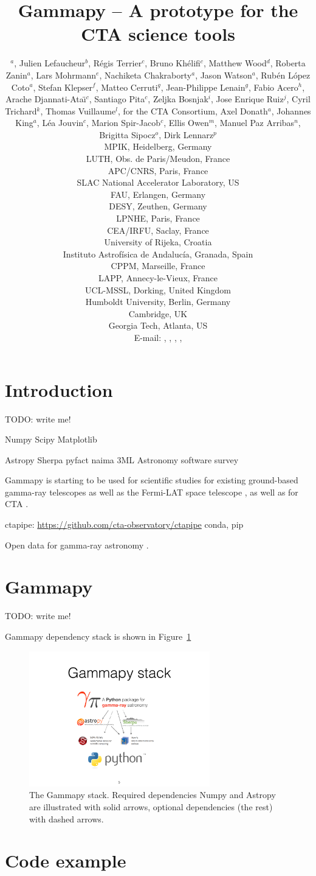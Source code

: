 \documentclass{PoS}
\title{Gammapy -- A prototype for the CTA science tools}
\author{
\speaker{Christoph Deil}$^a$,
Julien Lefaucheur$^b$,
R\'egis Terrier$^c$,
Bruno Kh\'elifi$^c$,
Matthew Wood$^d$,
Roberta Zanin$^a$,
Lars Mohrmann$^e$,
Nachiketa Chakraborty$^a$,
Jason Watson$^a$,
Rub\'en L\'opez Coto$^a$,
Stefan Klepser$^f$,
Matteo Cerruti$^g$,
Jean-Philippe Lenain$^g$,
Fabio Acero$^h$,
Arache Djannati-Ata{\"\i}$^c$,
Santiago Pita$^c$,
Zeljka Bosnjak$^i$,
Jose Enrique Ruiz$^j$,
Cyril Trichard$^k$,
Thomas Vuillaume$^l$,
for the CTA Consortium,
Axel Donath$^a$,
Johannes King$^a$,
L\'ea Jouvin$^c$,
Marion Spir-Jacob$^c$,
Ellis Owen$^m$,
Manuel Paz Arribas$^n$,
Brigitta Sipocz$^o$,
Dirk Lennarz$^p$
\\
\llap{$^a$}MPIK, Heidelberg, Germany\\
\llap{$^b$}LUTH, Obs. de Paris/Meudon, France\\
\llap{$^c$}APC/CNRS, Paris, France\\
\llap{$^d$}SLAC National Accelerator Laboratory, US\\
\llap{$^e$}FAU, Erlangen, Germany\\
\llap{$^f$}DESY, Zeuthen, Germany\\
\llap{$^g$}LPNHE, Paris, France\\
\llap{$^h$}CEA/IRFU, Saclay, France\\
\llap{$^i$}University of Rijeka, Croatia\\
\llap{$^j$}Instituto Astrof\'isica de Andaluc\'ia, Granada, Spain\\
\llap{$^k$}CPPM, Marseille, France\\
\llap{$^l$}LAPP, Annecy-le-Vieux, France\\
\llap{$^m$}UCL-MSSL, Dorking, United Kingdom\\
\llap{$^n$}Humboldt University, Berlin, Germany\\
\llap{$^o$}Cambridge, UK\\
\llap{$^p$}Georgia Tech, Atlanta, US\\
E-mail:
\email{Christoph.Deil@mpi-hd.mpg.de},
\email{julien.lefaucheur@obspm.fr},
\email{Roberta.Zanin@mpi-hd.mpg.de},
\email{khelifi@apc.in2p3.fr},
}
\newcommand{\url}[1]{\href{#1}{#1}}
\begin{document}
\section{Introduction}
\label{sec:intro}

TODO: write me!

Numpy \cite{numpy}
Scipy \cite{scipy}
Matplotlib \cite{matplotlib}

Astropy \cite{astropy}
Sherpa \cite{sherpa2001, sherpa2009, sherpa2011}
pyfact \cite{pyfact}
naima \cite{naima}
3ML \cite{3ml}
Astronomy software survey \cite{momcheva2015}

Gammapy is starting to be used for scientific studies for existing ground-based
gamma-ray telescopes \cite{hgps, shells} as well as the Fermi-LAT space
telescope \cite{owen2015}, as well as for CTA \cite{julien, roberta, cyril}.

ctapipe: \url{https://github.com/cta-observatory/ctapipe}
conda, pip

Open data for gamma-ray astronomy \cite{opendata}.

\section{Gammapy}
\label{sec:gammapy}

TODO: write me!

Gammapy dependency stack is shown in Figure~\ref{fig:stack}

\begin{figure}[t]
\centering
\includegraphics[width=0.7\textwidth]{figures/gammapy-stack}
\caption{
The Gammapy stack. Required dependencies Numpy and Astropy are illustrated with solid arrows, optional dependencies (the rest) with dashed arrows.
}
\label{fig:stack}
\end{figure}

\section{Code example}
\label{sec:code}
\end{document}
